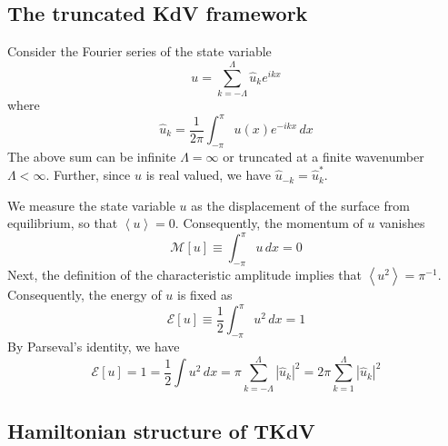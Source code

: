 \documentclass[11pt]{article}
\newcommand{\abs}[1]{\left| #1 \right|}
\newcommand{\mean}[1]{\left< #1 \right>}
\newcommand{\dx}{\, dx}
\newcommand{\En}{\mathcal{E}}
\newcommand{\Mo}{\mathcal{M}}
\newcommand{\uhat}{\hat{u}}
\begin{document}
\subsection{The truncated KdV framework}
\label{tKdVSec}

Consider the Fourier series of the state variable
\begin{equation}
u = \sum_{k=-\Lambda}^{\Lambda} \uhat_k e^{i k x}
\end{equation}
where
\begin{equation}
\uhat_k = \frac{1}{2 \pi} \int_{-\pi}^{\pi} u(x) e^{-i k x} \dx
\end{equation}
The above sum can be infinite $\Lambda = \infty$ or truncated at a finite wavenumber $\Lambda < \infty$. Further, since $u$ is real valued, we have $\uhat_{-k} = \uhat_{k}^*$.


We measure the state variable $u$ as the displacement of the surface from equilibrium, so that $\mean{u} = 0$. Consequently, the momentum of $u$ vanishes
\begin{equation}
\Mo[u] \equiv \int_{-\pi}^{\pi} u \dx = 0
\end{equation}
Next, the definition of the characteristic amplitude implies that $\mean{u^2} = \pi^{-1}$. Consequently, the energy of $u$ is fixed as
\begin{equation}
\En[u] \equiv \frac{1}{2} \int_{-\pi}^{\pi} u^2 \dx = 1
\end{equation}
By Parseval's identity, we have
\begin{equation}
\En[u] = 1 = \frac{1}{2} \int u^2 \dx = \pi \sum_{k=-\Lambda}^{\Lambda} \abs{\uhat_k}^2 = 2 \pi \sum_{k=1}^{\Lambda} \abs{\uhat_k}^2
\end{equation}

\subsection{Hamiltonian structure of TKdV}
\end{document}
